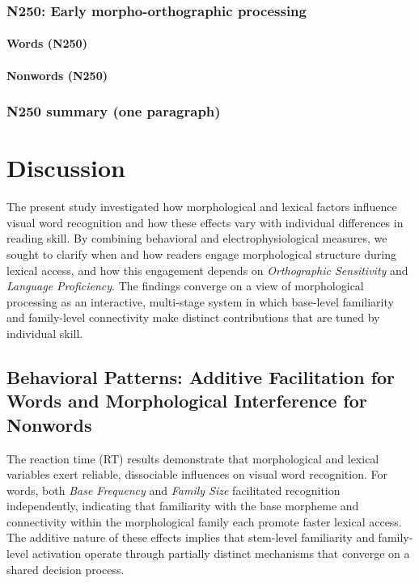\documentclass[preprint,12pt, authoryear, review]{elsarticle}
\begin{document}
		\subsubsection{N250: Early morpho-orthographic processing}

			\paragraph*{Words (N250)}

			\paragraph*{Nonwords (N250)}

		\subsubsection{N250 summary (one paragraph)}
		
		
		
\section{Discussion}

The present study investigated how morphological and lexical factors influence visual word recognition and how these effects vary with individual differences in reading skill. By combining behavioral and electrophysiological measures, we sought to clarify when and how readers engage morphological structure during lexical access, and how this engagement depends on \textit{Orthographic Sensitivity} and \textit{Language Proficiency}. The findings converge on a view of morphological processing as an interactive, multi-stage system in which base-level familiarity and family-level connectivity make distinct contributions that are tuned by individual skill.

\subsection{Behavioral Patterns: Additive Facilitation for Words and Morphological Interference for Nonwords}

The reaction time (RT) results demonstrate that morphological and lexical variables exert reliable, dissociable influences on visual word recognition. For words, both \textit{Base Frequency} and \textit{Family Size} facilitated recognition independently, indicating that familiarity with the base morpheme and connectivity within the morphological family each promote faster lexical access. The additive nature of these effects implies that stem-level familiarity and family-level activation operate through partially distinct mechanisms that converge on a shared decision process. 
\end{document}

